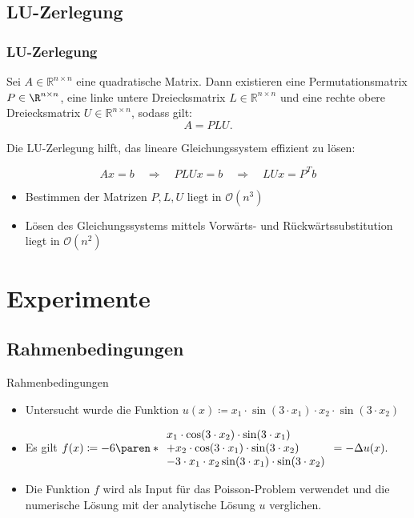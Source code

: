 \documentclass[9pt, t]{beamer}
\begin{document}
\subsection{LU-Zerlegung}
\begin{frame}
\frametitle{LU-Zerlegung}

Sei \(A \in \mathbb{R}^{n \times n}\) eine quadratische Matrix. Dann existieren eine
Permutationsmatrix \(P \in \R^{n \times n}\), eine linke untere Dreiecksmatrix
\(L \in \mathbb{R}^{n \times n}\) und eine rechte obere Dreiecksmatrix \(U \in \mathbb{R}^{n
\times n}\), sodass gilt:
\[
    A = PLU.
\]

Die LU-Zerlegung  hilft, das lineare Gleichungssystem effizient zu lösen:

\[
    A x = b \quad \Rightarrow \quad PLU x = b \quad \Rightarrow \quad LU x = P^T b
\]
\begin{itemize}
    \item Bestimmen der Matrizen \(P, L, U\) liegt in \(\mathcal{O}(n^3)\)
    \item Lösen des Gleichungssystems mittels Vorwärts- und Rückwärtssubstitution liegt in \(\mathcal{O}(n^2)\)
\end{itemize}
\end{frame}



\section{Experimente}
\subsection{Rahmenbedingungen}
\begin{frame}{Rahmenbedingungen}
    \begin{itemize}
        \item Untersucht wurde die Funktion \(u(x) \coloneq x_1 \cdot \sin(3 \cdot x_1) \cdot x_2 \cdot \sin(3 \cdot x_2)\)
        \item Es gilt \(f(x) \coloneq -6 \paren*{\begin{array}{l}
            x_1 \cdot \cos(3 \cdot x_2) \cdot \sin(3 \cdot x_1)   \\
            + x_2 \cdot \cos(3 \cdot x_1) \cdot \sin(3 \cdot x_2) \\
            - 3 \cdot x_1 \cdot x_2 \sin(3 \cdot x_1) \cdot \sin(3 \cdot x_2)
        \end{array}}
    = -\Delta u(x). \)
        \item Die Funktion \(f\) wird als Input für das Poisson-Problem verwendet
        und die numerische Lösung mit der analytische Lösung \(u\) verglichen.
    \end{itemize}
    
\end{frame}
\end{document}
